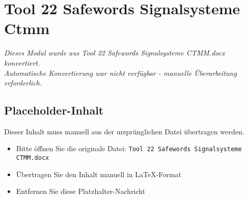 
\section{Tool 22 Safewords Signalsysteme Ctmm}
\label{sec:tool-22-safewords-signalsysteme-ctmm}

\begin{center}
\textit{Dieses Modul wurde aus Tool 22 Safewords Signalsysteme CTMM.docx konvertiert.\\
Automatische Konvertierung war nicht verfügbar - manuelle Überarbeitung erforderlich.}
\end{center}


\subsection{Placeholder-Inhalt}

Dieser Inhalt muss manuell aus der ursprünglichen Datei übertragen werden.

\begin{itemize}
\item Bitte öffnen Sie die originale Datei: \texttt{Tool 22 Safewords Signalsysteme CTMM.docx}
\item Übertragen Sie den Inhalt manuell in LaTeX-Format
\item Entfernen Sie diese Platzhalter-Nachricht
\end{itemize}
